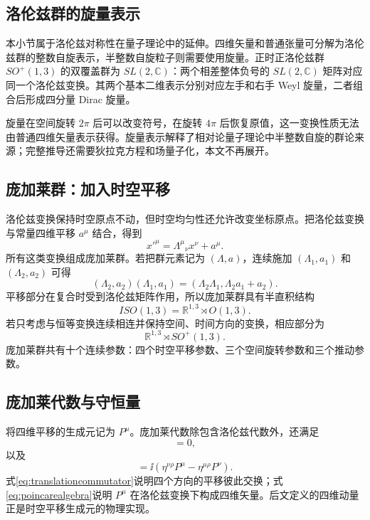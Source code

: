 \documentclass[style=classic,color=full]{lc-article}
\begin{document}
\subsection{洛伦兹群的旋量表示}

本小节属于洛伦兹对称性在量子理论中的延伸。四维矢量和普通张量可分解为洛伦兹群的整数自旋表示，半整数自旋粒子则需要使用旋量。正时正洛伦兹群 $SO^+(1,3)$ 的双覆盖群为 $SL(2,\mathbb C)$：两个相差整体负号的 $SL(2,\mathbb C)$ 矩阵对应同一个洛伦兹变换。其两个基本二维表示分别对应左手和右手 Weyl 旋量，二者组合后形成四分量 Dirac 旋量。

旋量在空间旋转 $2\pi$ 后可以改变符号，在旋转 $4\pi$ 后恢复原值，这一变换性质无法由普通四维矢量表示获得。旋量表示解释了相对论量子理论中半整数自旋的群论来源；完整推导还需要狄拉克方程和场量子化，本文不再展开\cite{weinberg1995}。

\subsection{庞加莱群：加入时空平移}

洛伦兹变换保持时空原点不动，但时空均匀性还允许改变坐标原点。把洛伦兹变换与常量四维平移 $a^\mu$ 结合，得到
\begin{equation}
  x'^\mu={\Lambda^\mu}_{\nu}x^\nu+a^\mu.
  \label{eq:poincaretransformation}
\end{equation}
所有这类变换组成庞加莱群。若把群元素记为 $(\Lambda,a)$，连续施加 $(\Lambda_1,a_1)$ 和 $(\Lambda_2,a_2)$ 可得
\begin{equation}
  (\Lambda_2,a_2)(\Lambda_1,a_1)
  =\left(\Lambda_2\Lambda_1,
    \Lambda_2a_1+a_2\right).
  \label{eq:poincareproduct}
\end{equation}
平移部分在复合时受到洛伦兹矩阵作用，所以庞加莱群具有半直积结构
\begin{equation}
  ISO(1,3)=\mathbb R^{1,3}\rtimes O(1,3).
\end{equation}
若只考虑与恒等变换连续相连并保持空间、时间方向的变换，相应部分为
\begin{equation}
  \mathbb R^{1,3}\rtimes SO^+(1,3).
\end{equation}
庞加莱群共有十个连续参数：四个时空平移参数、三个空间旋转参数和三个推动参数。

\subsection{庞加莱代数与守恒量}

将四维平移的生成元记为 $P^\mu$。庞加莱代数除包含洛伦兹代数外，还满足
\begin{equation}
  [P^\mu,P^\nu]=0,
  \label{eq:translationcommutator}
\end{equation}
以及
\begin{equation}
  [M^{\mu\nu},P^\rho]
  =\ii\left(
    \eta^{\nu\rho}P^\mu
    -\eta^{\mu\rho}P^\nu
  \right).
  \label{eq:poincarealgebra}
\end{equation}
式\eqref{eq:translationcommutator}说明四个方向的平移彼此交换；式\eqref{eq:poincarealgebra}说明 $P^\mu$ 在洛伦兹变换下构成四维矢量。后文定义的四维动量正是时空平移生成元的物理实现。
\end{document}
